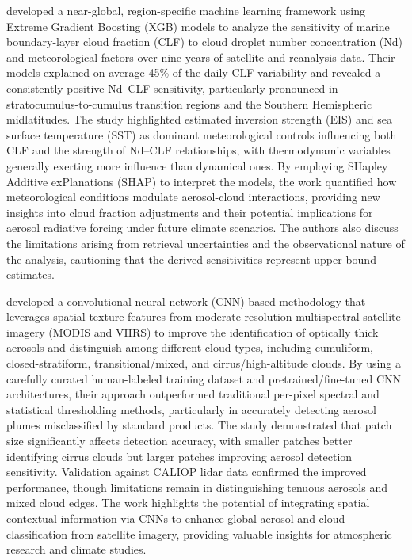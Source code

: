 \documentclass[11pt]{article}
\begin{document}
\citet{jia2024analysis} developed a near-global, region-specific machine learning framework using Extreme Gradient Boosting (XGB) models to analyze the sensitivity of marine boundary-layer cloud fraction (CLF) to cloud droplet number concentration (Nd) and meteorological factors over nine years of satellite and reanalysis data. Their models explained on average 45\% of the daily CLF variability and revealed a consistently positive Nd–CLF sensitivity, particularly pronounced in stratocumulus-to-cumulus transition regions and the Southern Hemispheric midlatitudes. The study highlighted estimated inversion strength (EIS) and sea surface temperature (SST) as dominant meteorological controls influencing both CLF and the strength of Nd–CLF relationships, with thermodynamic variables generally exerting more influence than dynamical ones. By employing SHapley Additive exPlanations (SHAP) to interpret the models, the work quantified how meteorological conditions modulate aerosol-cloud interactions, providing new insights into cloud fraction adjustments and their potential implications for aerosol radiative forcing under future climate scenarios. The authors also discuss the limitations arising from retrieval uncertainties and the observational nature of the analysis, cautioning that the derived sensitivities represent upper-bound estimates.

\citet{marais2020leveraging} developed a convolutional neural network (CNN)-based methodology that leverages spatial texture features from moderate-resolution multispectral satellite imagery (MODIS and VIIRS) to improve the identification of optically thick aerosols and distinguish among different cloud types, including cumuliform, closed-stratiform, transitional/mixed, and cirrus/high-altitude clouds. By using a carefully curated human-labeled training dataset and pretrained/fine-tuned CNN architectures, their approach outperformed traditional per-pixel spectral and statistical thresholding methods, particularly in accurately detecting aerosol plumes misclassified by standard products. The study demonstrated that patch size significantly affects detection accuracy, with smaller patches better identifying cirrus clouds but larger patches improving aerosol detection sensitivity. Validation against CALIOP lidar data confirmed the improved performance, though limitations remain in distinguishing tenuous aerosols and mixed cloud edges. The work highlights the potential of integrating spatial contextual information via CNNs to enhance global aerosol and cloud classification from satellite imagery, providing valuable insights for atmospheric research and climate studies.
\end{document}
